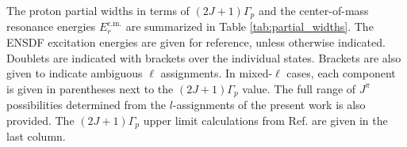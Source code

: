 \begin{table}[t]
\begin{minipage}{\textwidth}
{\begin{tabular}{llllllc}
\hline\hline
\end{tabular}
}
\end{minipage}
\end{table}
\endgroup

The proton partial widths in terms of $(2J+1)\Gamma_{p}$ and the center-of-mass resonance energies $E^{\mathrm{c.m.}}_{r}$ are summarized in Table \ref{tab:partial_widths}. The ENSDF \cite{Chen2017} excitation energies are given for reference, unless otherwise indicated. Doublets are indicated with brackets over the individual states. Brackets are also given to indicate ambiguous $\ell$ assignments. In mixed-$\ell$ cases, each component is given in parentheses next to the $(2J+1)\Gamma_{p}$ value. The full range of $J^{\pi}$ possibilities determined from the $l$-assignments of the present work is also provided. The $(2J+1)\Gamma_{p}$ upper limit calculations from Ref. \cite{Longland2018} are given in the last column.

